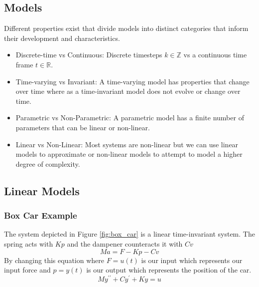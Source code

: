 \documentclass[11pt]{article}
\begin{document}
\subsection{Models}
Different properties exist that divide models into distinct categories that inform their development and characteristics.
\begin{itemize}
    \item Discrete-time vs Continuous: Discrete timesteps $k \in \mathbb{Z}$ vs a continuous time frame $t \in \mathbb{R}$.
    \item Time-varying vs Invariant: A time-varying model has properties that change over time where as a time-invariant model does not evolve or change over time.
    \item Parametric vs Non-Parametric: A parametric model has a finite number of parameters that can be linear or non-linear.
    \item Linear vs Non-Linear: Most systems are non-linear but we can use linear models to approximate or non-linear models to attempt to model a higher degree of complexity.
\end{itemize}

\subsection{Linear Models}

\subsubsection{Box Car Example}

The system depicted in Figure \ref{fig:box_car} is a linear time-invariant system.
The spring acts with $Kp$ and the dampener counteracts it with $Cv$
\begin{equation}
    Ma = F - Kp - Cv
\end{equation}
By changing this equation where $F = u(t)$ is our input which represents our input force  and $p = y(t)$ is our output which represents the position of the car.
\begin{equation}
    M y^{\prime \prime} + C y^\prime + K y = u 
\end{equation}
\end{document}
